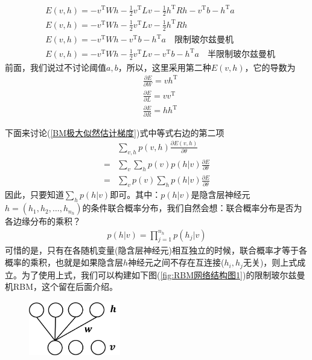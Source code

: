 {            \begin{align*}
            & E(v,h) = -v^\mathrm{T}Wh - \frac{1}{2}v^\mathrm{T}Lv - \frac{1}{2}h^\mathrm{T}Rh - v^\mathrm{T}b-h^\mathrm{T}a\\
            & E(v,h) = -v^\mathrm{T}Wh - \frac{1}{2}v^\mathrm{T}Lv - \frac{1}{2}h^\mathrm{T}Rh\\
            & E(v,h) = -v^\mathrm{T}Wh - v^\mathrm{T}b-h^\mathrm{T}a \quad \text{限制玻尔兹曼机}\\
            & E(v,h) = -v^\mathrm{T}Wh - \frac{1}{2}v^\mathrm{T}Lv - v^\mathrm{T}b-h^\mathrm{T}a\quad\text{半限制玻尔兹曼机}
            \end{align*}
            前面，我们说过不讨论阈值$a,b$，所以，这里采用第二种$E(v,h)$，它的导数为
            \begin{align*}
            & \frac{\partial E}{\partial W} = vh^\mathrm{T}\\
            & \frac{\partial E}{\partial L} = vv^\mathrm{T}\\
            & \frac{\partial E}{\partial R} = hh^\mathrm{T}
            \end{align*}
            \par
            下面来讨论(\ref{BM极大似然估计梯度})式中等式右边的第二项
            \begin{align*}
            &\sum_{v,h}p(v,h) \frac{\partial E(v,h)}{\partial \theta}\\
            = {}&\sum_v\sum_h p(v)p(h|v)\frac{\partial E}{\partial \theta}\\
            = {}&\sum_vp(v)\sum_hp(h|v)\frac{\partial E}{\partial \theta}
            \end{align*}
            因此，只要知道$\sum_hp(h|v)$即可。其中：$p(h|v)$是隐含层神经元$h = (h_1,h_2,\dots,h_{n_h})$的条件联合概率分布，我们自然会想：联合概率分布是否为各边缘分布的乘积？
            \begin{align*}
            p(h|v) = \prod_{j=1}^{n_h}p(h_j|v)
            \end{align*}
            可惜的是，只有在各随机变量(隐含层神经元)相互独立的时候，联合概率才等于各概率的乘积，也就是如果隐含层$h$神经元之间不存在互连接($h_i,h_j$无关)，则上式成立。为了使用上式，我们可以构建如下图(\ref{fig:RBM网络结构图1})的限制玻尔兹曼机RBM，这个留在后面介绍。
            \begin{figure}[H]
            \centering
            \includegraphics[width=4cm]{images/RBM_net_structure1.jpg}

\end{figure}}
